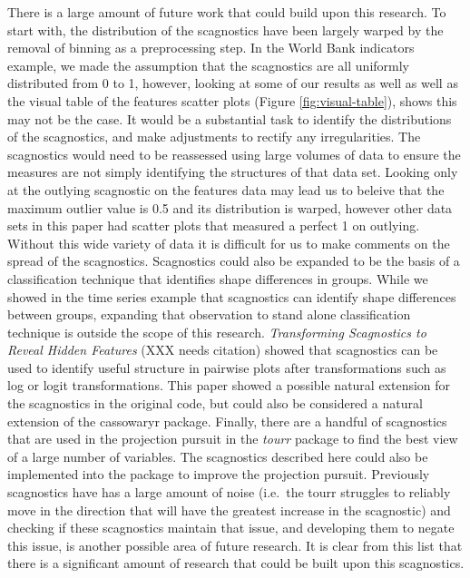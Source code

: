There is a large amount of future work that could build upon this
research. To start with, the distribution of the scagnostics have been
largely warped by the removal of binning as a preprocessing step. In the
World Bank indicators example, we made the assumption that the
scagnostics are all uniformly distributed from 0 to 1, however, looking
at some of our results as well as well as the visual table of the
features scatter plots (Figure \ref{fig:visual-table}), shows this may
not be the case. It would be a substantial task to identify the
distributions of the scagnostics, and make adjustments to rectify any
irregularities. The scagnostics would need to be reassessed using large
volumes of data to ensure the measures are not simply identifying the
structures of that data set. Looking only at the outlying scagnostic on
the features data may lead us to beleive that the maximum outlier value
is 0.5 and its distribution is warped, however other data sets in this
paper had scatter plots that measured a perfect 1 on outlying. Without
this wide variety of data it is difficult for us to make comments on the
spread of the scagnostics. Scagnostics could also be expanded to be the
basis of a classification technique that identifies shape differences in
groups. While we showed in the time series example that scagnostics can
identify shape differences between groups, expanding that observation to
stand alone classification technique is outside the scope of this
research. \emph{Transforming Scagnostics to Reveal Hidden Features} (XXX
needs citation) showed that scagnostics can be used to identify useful
structure in pairwise plots after transformations such as log or logit
transformations. This paper showed a possible natural extension for the
scagnostics in the original code, but could also be considered a natural
extension of the cassowaryr package. Finally, there are a handful of
scagnostics that are used in the projection pursuit in the \emph{tourr}
package to find the best view of a large number of variables. The
scagnostics described here could also be implemented into the package to
improve the projection pursuit. Previously scagnostics have has a large
amount of noise (i.e.~the tourr struggles to reliably move in the
direction that will have the greatest increase in the scagnostic) and
checking if these scagnostics maintain that issue, and developing them
to negate this issue, is another possible area of future research. It is
clear from this list that there is a significant amount of research that
could be built upon this scagnostics.


